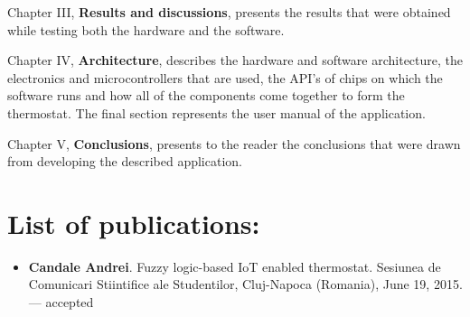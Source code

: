 \qquad Chapter III, \textbf{Results and discussions}, presents the results that were obtained while testing
both the hardware and the software.

\qquad Chapter IV, \textbf{Architecture}, describes the hardware and software architecture, the electronics
and microcontrollers that are used, the API's of chips on which the software runs and how all of the
components come together to form the thermostat. The final section represents the user manual of the
application.

\quad Chapter V, \textbf{Conclusions}, presents to the reader the conclusions that were drawn from developing
the described application.

\section*{List of publications:}

\begin{itemize}
    \item \textbf{Candale Andrei}. Fuzzy logic-based IoT enabled thermostat. Sesiunea de Comunicari
    Stiintifice ale Studentilor, Cluj-Napoca (Romania), June 19, 2015. --- accepted
\end{itemize}
